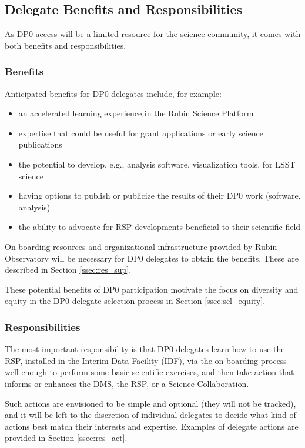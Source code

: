 \documentclass[DM,lsstdraft,authoryear,toc]{lsstdoc}
\begin{document}
\subsection{Delegate Benefits and Responsibilities}\label{ssec:intro_del}

As DP0 access will be a limited resource for the science community, it comes with both benefits and responsibilities.

\subsubsection{Benefits}\label{sssec:intro_del_bene}

Anticipated benefits for DP0 delegates include, for example:
\begin{itemize}
\item an accelerated learning experience in the Rubin Science Platform
\item expertise that could be useful for grant applications or early science publications
\item the potential to develop, e.g., analysis software, visualization tools, for LSST science 
\item having options to publish or publicize the results of their DP0 work (software, analysis)
\item the ability to advocate for RSP developments beneficial to their scientific field
\end{itemize}

On-boarding resources and organizational infrastructure provided by Rubin Observatory will be necessary for DP0 delegates to obtain the benefits.
These are described in Section \ref{ssec:res_sup}.

These potential benefits of DP0 participation motivate the focus on diversity and equity in the DP0 delegate selection process in Section \ref{ssec:sel_equity}.

\subsubsection{Responsibilities}\label{sssec:intro_del_resp}

The most important responsibility is that DP0 delegates learn how to use the RSP, installed in the Interim Data Facility (IDF), via the on-boarding process well enough to perform some basic scientific exercises, and then take action that informs or enhances the DMS, the RSP, or a Science Collaboration. 

Such actions are envisioned to be simple and optional (they will not be tracked), and it will be left to the discretion of individual delegates to decide what kind of actions best match their interests and expertise.
Examples of delegate actions are provided in Section \ref{ssec:res_act}.
\end{document}
